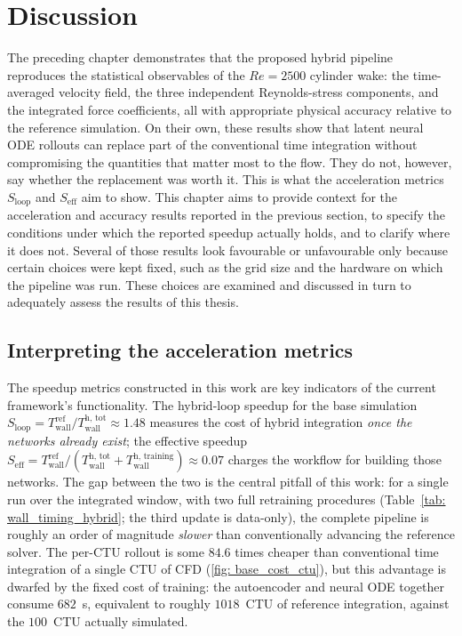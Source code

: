 \chapter{Discussion}
\label{chap: disussion}

The preceding chapter demonstrates that the proposed hybrid pipeline reproduces the statistical observables of the $Re = 2500$ cylinder wake: the time-averaged velocity field, the three independent Reynolds-stress components, and the integrated force coefficients, all with appropriate physical accuracy relative to the reference simulation. On their own, these results show that latent neural ODE rollouts can replace part of the conventional time integration without compromising the quantities that matter most to the flow. They do not, however, say whether the replacement was worth it. This is what the acceleration metrics $S_\text{loop}$ and $S_\text{eff}$ aim to show. This chapter aims to provide context for the acceleration and accuracy results reported in the previous section, to specify the conditions under which the reported speedup actually holds, and to clarify where it does not. Several of those results look favourable or unfavourable only because certain choices were kept fixed, such as the grid size and the hardware on which the pipeline was run. These choices are examined and discussed in turn to adequately assess the results of this thesis.


\section{Interpreting the acceleration metrics}
\label{sect: disc_metrics}

The speedup metrics constructed in this work are key indicators of the current framework's functionality. The hybrid-loop speedup for the base simulation $S_\text{loop} = T_\text{wall}^\text{ref} /T_\text{wall}^\text{h, tot} \approx 1.48$ measures the cost of hybrid integration \emph{once the networks already exist}; the effective speedup $S_\text{eff} = T_\text{wall}^\text{ref} / (T_\text{wall}^\text{h, tot} + T_\text{wall}^\text{h, training}) \approx 0.07$ charges the workflow for building those networks. The gap between the two is the central pitfall of this work: for a single run over the integrated window, with two full retraining procedures (Table~\ref{tab: wall_timing_hybrid}; the third update is data-only), the complete pipeline is roughly an order of magnitude \emph{slower} than conventionally advancing the reference solver. The per-CTU rollout is some $84.6$ times cheaper than conventional time integration of a single CTU of CFD (\autoref{fig: base_cost_ctu}), but this advantage is dwarfed by the fixed cost of training: the autoencoder and neural ODE together consume $682$~s, equivalent to roughly $1018$~CTU of reference integration, against the $100$~CTU actually simulated.

